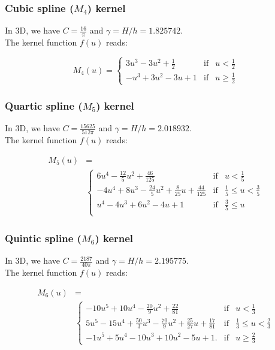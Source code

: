 \documentclass[a4paper]{mnras}
\begin{document}
\subsubsection{Cubic spline ($M_4$) kernel}

In 3D, we have $C=\frac{16}{\pi}$ and $\gamma=H/h = 1.825742$.\\
The kernel function $f(u)$ reads:

\begin{equation}
  M_4(u) = \left\lbrace\begin{array}{rcl}
  3u^3 - 3u^2 + \frac{1}{2} & \mbox{if} & u<\frac{1}{2}\\
  -u^3 + 3u^2 - 3u + 1 & \mbox{if} & u \geq \frac{1}{2}
  \end{array}
  \right.
    \nonumber
\end{equation}


\subsubsection{Quartic spline ($M_5$) kernel}

In 3D, we have $C=\frac{15625}{512\pi}$ and $\gamma=H/h = 2.018932$.\\
The kernel function $f(u)$ reads:

\begin{align}
  M_5(u) &=     \nonumber\\
  &\left\lbrace\begin{array}{rcl}
  6u^4 - \frac{12}{5}u^2 + \frac{46}{125} & \mbox{if} & u < \frac{1}{5} \\
  -4u^4 + 8u^3  - \frac{24}{5}u^2 + \frac{8}{25}u + \frac{44}{125} &  \mbox{if} &  \frac{1}{5} \leq u < \frac{3}{5}\\
  u^4 - 4u^3 + 6u^2 - 4u + 1 &  \mbox{if} &  \frac{3}{5} \leq u \\
  \end{array}
  \right.
  \nonumber
\end{align}


\subsubsection{Quintic spline ($M_6$) kernel}

In 3D, we have $C=\frac{2187}{40\pi}$ and $\gamma=H/h = 2.195775$.\\
The kernel function $f(u)$ reads:

\begin{align}
  M_6(u) &=     \nonumber\\
  &\left\lbrace\begin{array}{rcl}
  -10u^5 + 10u^4 - \frac{20}{9}u^2 + \frac{22}{81} & \mbox{if} & u < \frac{1}{3} \\
  5u^5 - 15u^4 + \frac{50}{3}u^3 - \frac{70}{9}u^2 + \frac{25}{27}u + \frac{17}{81} &  \mbox{if} &  \frac{1}{3} \leq u < \frac{2}{3}\\
  -1u^5 + 5u^4 - 10u^3 + 10u^2 - 5u + 1. & \mbox{if} & u \geq \frac{2}{3}
  \end{array}
  \right.
      \nonumber
\end{align}
\end{document}
